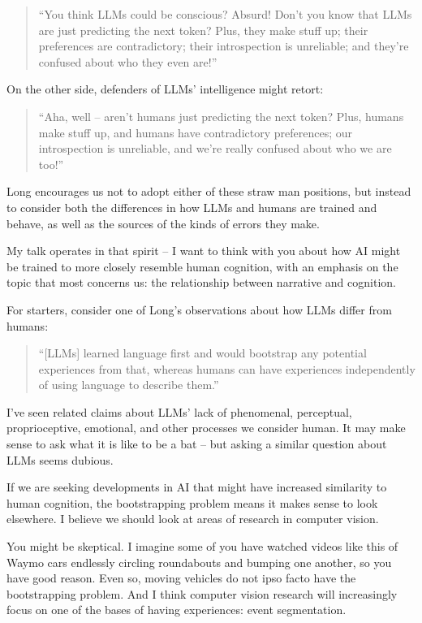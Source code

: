 \documentclass[11pt,a4paper]{article}
\begin{document}
\begin{quote}
``You think LLMs could be conscious? Absurd! Don't you know that LLMs are just predicting the next token? Plus, they make stuff up; their preferences are contradictory; their introspection is unreliable; and they're confused about who they even are!'' \citep{long2026experience}
\end{quote}

On the other side, defenders of LLMs' intelligence might retort:

\begin{quote}
``Aha, well -- aren't humans just predicting the next token? Plus, humans make stuff up, and humans have contradictory preferences; our introspection is unreliable, and we're really confused about who we are too!'' \citep{long2026experience}
\end{quote}

Long encourages us not to adopt either of these straw man positions, but instead to consider both the differences in how LLMs and humans are trained and behave, as well as the sources of the kinds of errors they make.

My talk operates in that spirit -- I want to think with you about how AI might be trained to more closely resemble human cognition, with an emphasis on the topic that most concerns us: the relationship between narrative and cognition.

For starters, consider one of Long's observations about how LLMs differ from humans:

\begin{quote}
``[LLMs] learned language first and would bootstrap any potential experiences from that, whereas humans can have experiences independently of using language to describe them.'' \citep{long2026experience}
\end{quote}

I've seen related claims about LLMs' lack of phenomenal, perceptual, proprioceptive, emotional, and other processes we consider human. It may make sense to ask what it is like to be a bat -- but asking a similar question about LLMs seems dubious.

If we are seeking developments in AI that might have increased similarity to human cognition, the bootstrapping problem means it makes sense to look elsewhere. I believe we should look at areas of research in computer vision.

You might be skeptical. I imagine some of you have watched videos like this of Waymo cars endlessly circling roundabouts and bumping one another, so you have good reason. Even so, moving vehicles do not ipso facto have the bootstrapping problem. And I think computer vision research will increasingly focus on one of the bases of having experiences: event segmentation.
\end{document}

